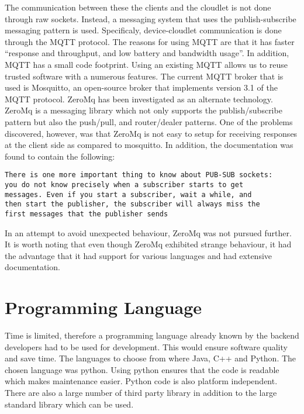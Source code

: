 The communication between these the clients and the cloudlet is not done through raw sockets. Instead, a messaging system that uses the publish-subscribe messaging pattern is used. Specificaly, device-cloudlet
communication is done through the MQTT protocol. The reasons for using MQTT are that it has faster “response and throughput, and low battery and bandwidth usage”\cite{Holmwebsite}. In addition, MQTT has a small
code footprint\cite{mqttwebsite}. Using an existing MQTT allows us to reuse trusted software with a numerous features. The current MQTT broker that is used is Mosquitto, an open-source broker that implements version 3.1 of the MQTT protocol. ZeroMq has been investigated as an alternate technology.
ZeroMq is a messaging library which not only supports the publish/subscribe pattern but also the push/pull, and router/dealer patterns. One of the problems discovered, however, was that ZeroMq is not easy to setup
for receiving responses at the client side as compared to mosquitto. In addition, the documentation was found to contain the following:

\begin{verbatim}
There is one more important thing to know about PUB-SUB sockets:
you do not know precisely when a subscriber starts to get
messages. Even if you start a subscriber, wait a while, and
then start the publisher, the subscriber will always miss the
first messages that the publisher sends
\end{verbatim}

In an attempt to avoid unexpected behaviour, ZeroMq was not pursued further. It is worth noting that even though ZeroMq exhibited strange behaviour, it had the advantage that it had support for various languages
and had extensive documentation.

\section{Programming Language}
Time is limited, therefore a programming language already known by the backend developers had to be used for development. This would ensure software quality and save time. The languages to choose from where Java, C++ and
Python. The chosen language was python. Using python ensures that the code is readable which makes maintenance easier. Python code is also platform independent. There are also a large number of third party library in addition
to the large standard library which can be used.

